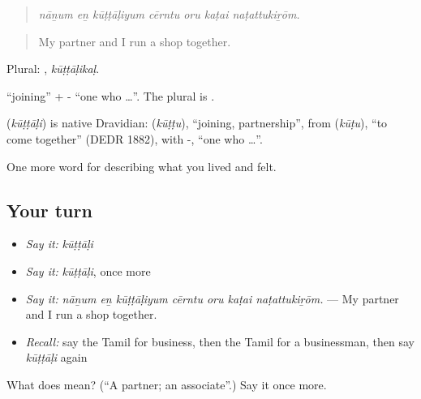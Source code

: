 \begin{quote}
\emph{nāṉum eṉ kūṭṭāḷiyum cērntu oru kaṭai naṭattukiṟōm.}
\end{quote}

\begin{quote}
My partner and I run a shop together.
\end{quote}

Plural: , \emph{kūṭṭāḷikaḷ}.

 \textquotedblleft{}joining\textquotedblright{} + - \textquotedblleft{}one who …\textquotedblright{}. The plural is .

\begin{cousinweb}
\textbf{} (\emph{kūṭṭāḷi}) is native Dravidian:  (\emph{kūṭṭu}), \textquotedblleft{}joining, partnership\textquotedblright{}, from  (\emph{kūṭu}), \textquotedblleft{}to come together\textquotedblright{} (DEDR 1882), with -, \textquotedblleft{}one who …\textquotedblright{}.
\end{cousinweb}

\begin{grammarlens}[title={What you've built}]
One more word for describing what you lived and felt.
\end{grammarlens}

\subsection*{Your turn}
\begin{itemize}
\raggedright
  \item \emph{Say it:} \emph{kūṭṭāḷi}
  \item \emph{Say it:} \emph{kūṭṭāḷi}, once more
  \item \emph{Say it:} \emph{nāṉum eṉ kūṭṭāḷiyum cērntu oru kaṭai naṭattukiṟōm.} — My partner and I run a shop together.
  \item \emph{Recall:} say the Tamil for business, then the Tamil for a businessman, then say \emph{kūṭṭāḷi} again
\end{itemize}

\begin{tcolorbox}[breakable,colback=teal!4,colframe=teal!35!black,title={Before you move on}]
What does  mean? (\textquotedblleft{}A partner; an associate\textquotedblright{}.) Say it once more.
\end{tcolorbox}
